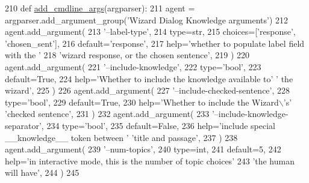 \begin{DoxyCode}
210     \textcolor{keyword}{def }\hyperlink{namespaceparlai_1_1agents_1_1drqa_1_1config_a62fdd5554f1da6be0cba185271058320}{add\_cmdline\_args}(argparser):
211         agent = argparser.add\_argument\_group(\textcolor{stringliteral}{'Wizard Dialog Knowledge arguments'})
212         agent.add\_argument(
213             \textcolor{stringliteral}{'--label-type'},
214             type=str,
215             choices=[\textcolor{stringliteral}{'response'}, \textcolor{stringliteral}{'chosen\_sent'}],
216             default=\textcolor{stringliteral}{'response'},
217             help=\textcolor{stringliteral}{'whether to populate label field with the '}
218             \textcolor{stringliteral}{'wizard response, or the chosen sentence'},
219         )
220         agent.add\_argument(
221             \textcolor{stringliteral}{'--include-knowledge'},
222             type=\textcolor{stringliteral}{'bool'},
223             default=\textcolor{keyword}{True},
224             help=\textcolor{stringliteral}{'Whether to include the knowledge available to'} \textcolor{stringliteral}{' the wizard'},
225         )
226         agent.add\_argument(
227             \textcolor{stringliteral}{'--include-checked-sentence'},
228             type=\textcolor{stringliteral}{'bool'},
229             default=\textcolor{keyword}{True},
230             help=\textcolor{stringliteral}{'Whether to include the Wizard\(\backslash\)'s'} \textcolor{stringliteral}{'checked sentence'},
231         )
232         agent.add\_argument(
233             \textcolor{stringliteral}{'--include-knowledge-separator'},
234             type=\textcolor{stringliteral}{'bool'},
235             default=\textcolor{keyword}{False},
236             help=\textcolor{stringliteral}{'include special \_\_knowledge\_\_ token between '} \textcolor{stringliteral}{'title and passage'},
237         )
238         agent.add\_argument(
239             \textcolor{stringliteral}{'--num-topics'},
240             type=int,
241             default=5,
242             help=\textcolor{stringliteral}{'in interactive mode, this is the number of topic choices'}
243             \textcolor{stringliteral}{'the human will have'},
244         )
245 
\end{DoxyCode}
\mbox{\label{classparlai_1_1tasks_1_1wizard__of__wikipedia_1_1agents_1_1WizardDialogKnowledgeTeacher_afb8212ad3cf99ccf6507eacef747f9d4}} 
